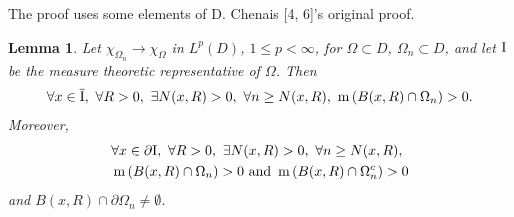 \documentclass{book}
\numberwithin{equation}{section}
\newtheorem{lemma}{Lemma}[section]
\begin{document}
\begin{enumerate}
    The proof uses some elements of D. Chenais [4, 6]'s original proof.
    
    \begin{lemma}
        Let $\chi_{\Omega_n}\to\chi_\Omega$ in $L^p(D)$, $1\le p < \infty$, for $\Omega\subset D$, $\Omega_n\subset D$, and let ${\rm I}$ be the measure theoretic representative of $\Omega$. Then
        \begin{align*}
            \forall x\in\overline{\rm I},\ \forall R > 0,\ \exists N(x,R) > 0,\ \forall n\ge N(x,R),\ \operatorname{m}\left(B(x,R)\cap\Omega_n\right) > 0.
        \end{align*}
        Moreover,
        \begin{align*}
            &\forall x\in\partial{\rm I},\ \forall R > 0,\ \exists N(x,R) > 0,\ \forall n\ge N(x,R),\\
            &\operatorname{m}\left(B(x,R)\cap\Omega_n\right) > 0 \mbox{ and } \operatorname{m}\left(B(x,R)\cap\Omega_n^c\right) > 0
        \end{align*}
        and $B(x,R)\cap\partial\Omega_n\ne\emptyset$.
    \end{lemma}
\end{enumerate}
\end{document}
